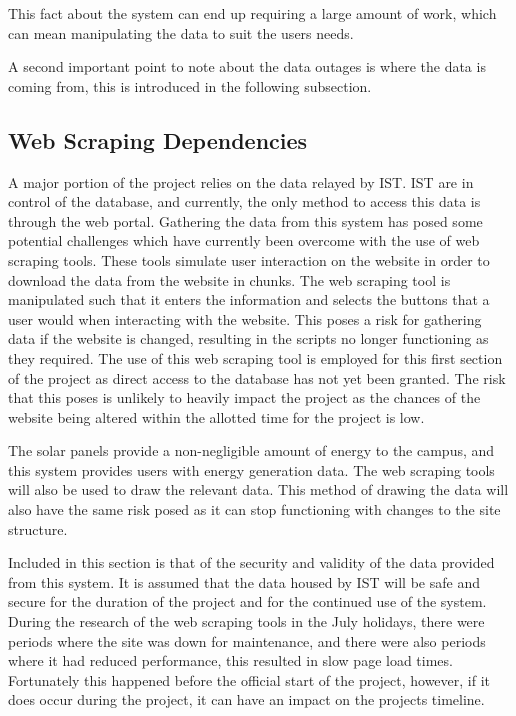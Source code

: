 \documentclass[12pt,onecolumn]{IEEEtran}
\begin{document}
This fact about the system can end up requiring a large amount of work, which can mean manipulating the data to suit the users needs.

A second important point to note about the data outages is where the data is coming from, this is introduced in the following subsection.

\subsection{Web Scraping Dependencies} \label{sec:WebScrapingDependencies}
A major portion of the project relies on the data relayed by IST. IST are in control of the database, and currently, the only method to access this data is through the web portal. Gathering the data from this system has posed some potential challenges which have currently been overcome with the use of web scraping tools. 
These tools simulate user interaction on the website in order to download the data from the website in chunks. The web scraping tool is manipulated such that it enters the information and selects the buttons that a user would when interacting with the website. 
This poses a risk for gathering data if the website is changed, resulting in the scripts no longer functioning as they required.
The use of this web scraping tool is employed for this first section of the project as direct access to the database has not yet been granted.
The risk that this poses is unlikely to heavily impact the project as the chances of the website being altered within the allotted time for the project is low.

The solar panels provide a non-negligible amount of energy to the campus, and this system provides users with energy generation data. The web scraping tools will also be used to draw the relevant data. This method of drawing the data will also have the same risk posed as it can stop functioning with changes to the site structure.

Included in this section is that of the security and validity of the data provided from this system. It is assumed that the data housed by IST will be safe and secure for the duration of the project and for the continued use of the system.
During the research of the web scraping tools in the July holidays, there were periods where the site was down for maintenance, and there were also periods where it had reduced performance, this resulted in slow page load times. Fortunately this happened before the official start of the project, however, if it does occur during the project, it can have an impact on the projects timeline.
\end{document}
